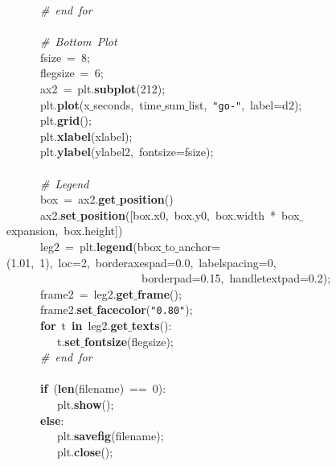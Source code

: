 \mbox{}\ \ \ \ \ \ \textit{\#\ end\ for} \\
\mbox{}\ \ \ \ \ \  \\
\mbox{}\ \ \ \ \ \ \textit{\#\ Bottom\ Plot} \\
\mbox{}\ \ \ \ \ \ fsize\ =\ 8; \\
\mbox{}\ \ \ \ \ \ flegsize\ =\ 6; \\
\mbox{}\ \ \ \ \ \ ax2\ =\ plt.\textbf{subplot}(212); \\
\mbox{}\ \ \ \ \ \ plt.\textbf{plot}(x$\_$seconds,\ time$\_$sum$\_$list,\ \texttt{"{}go-"{}},\ label=d2); \\
\mbox{}\ \ \ \ \ \ plt.\textbf{grid}(); \\
\mbox{}\ \ \ \ \ \ plt.\textbf{xlabel}(xlabel); \\
\mbox{}\ \ \ \ \ \ plt.\textbf{ylabel}(ylabel2,\ fontsize=fsize); \\
\mbox{}\ \ \ \ \ \  \\
\mbox{}\ \ \ \ \ \ \textit{\#\ Legend} \\
\mbox{}\ \ \ \ \ \ box\ =\ ax2.\textbf{get$\_$position}() \\
\mbox{}\ \ \ \ \ \ ax2.\textbf{set$\_$position}([box.x0,\ box.y0,\ box.width\ *\ box$\_$expansion,\ box.height]) \\
\mbox{}\ \ \ \ \ \ leg2\ =\ plt.\textbf{legend}(bbox$\_$to$\_$anchor=(1.01,\ 1),\ loc=2,\ borderaxespad=0.0,\ labelspacing=0,\  \\
\mbox{}\ \ \ \ \ \ \ \ \ \ \ \ \ \ \ \ \ \ \ \ \ \ \ \ borderpad=0.15,\ handletextpad=0.2); \\
\mbox{}\ \ \ \ \ \ frame2\ =\ leg2.\textbf{get$\_$frame}(); \\
\mbox{}\ \ \ \ \ \ frame2.\textbf{set$\_$facecolor}(\texttt{"{}0.80"{}}); \\
\mbox{}\ \ \ \ \ \ \textbf{for}\ t\ \textbf{in}\ leg2.\textbf{get$\_$texts}(): \\
\mbox{}\ \ \ \ \ \ \ \ \ t.\textbf{set$\_$fontsize}(flegsize); \\
\mbox{}\ \ \ \ \ \ \textit{\#\ end\ for} \\
\mbox{}\ \ \ \ \ \  \\
\mbox{}\ \ \ \ \ \ \textbf{if}\ (\textbf{len}(filename)\ ==\ 0): \\
\mbox{}\ \ \ \ \ \ \ \ \ plt.\textbf{show}(); \\
\mbox{}\ \ \ \ \ \ \textbf{else}: \\
\mbox{}\ \ \ \ \ \ \ \ \ plt.\textbf{savefig}(filename); \\
\mbox{}\ \ \ \ \ \ \ \ \ plt.\textbf{close}(); \\
